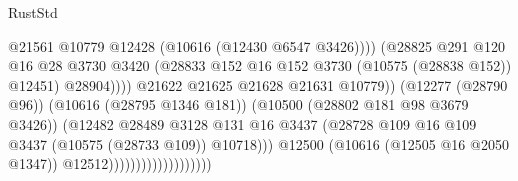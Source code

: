 \begin{lexlean}{RustStd}
\begin{coremodule}
                                                          @21561
                                                          @10779
                                                          @12428
                                                          (@10616 (@12430 @6547 @3426))))
                                                      (@28825
                                                        @291
                                                        @120
                                                        @16
                                                        @28
                                                        @3730
                                                        @3420
                                                        (@28833
                                                          @152
                                                          @16
                                                          @152
                                                          @3730
                                                          (@10575 (@28838 @152))
                                                          @12451)
                                                        @28904))))
                                                @21622
                                                @21625
                                                @21628
                                                @21631
                                                @10779))
                                            (@12277 (@28790 @96))
                                            (@10616 (@28795 @1346 @181))
                                            (@10500 (@28802 @181 @98 @3679 @3426))
                                            (@12482
                                              @28489
                                              @3128
                                              @131
                                              @16
                                              @3437
                                              (@28728
                                                @109
                                                @16
                                                @109
                                                @3437
                                                (@10575 (@28733 @109))
                                                @10718)))
                                          @12500
                                          (@10616 (@12505 @16 @2050 @1347))
                                          @12512)))))))))))))))))))

\end{coremodule}
\end{lexlean}
